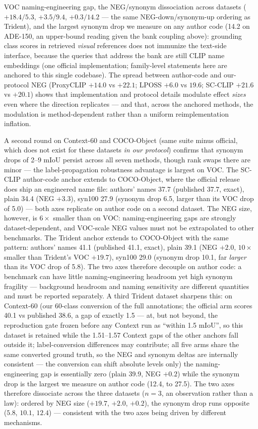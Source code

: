 \documentclass[11pt]{article}
\newcommand{\miou}{mIoU}
\begin{document}
VOC naming-engineering gap, the NEG/synonym dissociation across
datasets ($+18.4/5.3$, $+3.5/9.4$, $+0.3/14.2$ --- the same
NEG-down/synonym-up ordering as Trident), and the largest synonym drop
we measure on any author code (14.2 on ADE-150, an upper-bound reading
given the bank coupling above): grounding class scores
in retrieved \emph{visual} references does not immunize the text-side
interface, because the queries that address the bank are still CLIP
name embeddings (one official implementation; family-level statements
here are anchored to this single codebase).
The spread between author-code and
our-protocol NEG (ProxyCLIP $+14.0$ vs $+22.1$; LPOSS $+6.0$ vs $19.6$;
SC-CLIP $+21.6$ vs $+20.1$)
shows that implementation and protocol details modulate effect \emph{sizes}
even where the direction replicates --- and that, across the anchored
methods, the modulation is method-dependent rather than a uniform
reimplementation inflation.

A second round on Context-60 and COCO-Object (same suite minus official, which
does not exist for these datasets \emph{in our protocol}) confirms that
synonym drops of 2--9 \miou{}
persist across all seven methods, though rank swaps there are minor --- the
label-propagation robustness advantage is largest on VOC. The SC-CLIP
author-code anchor extends to COCO-Object, where the official release does
ship an engineered name file: authors' names 37.7 (published 37.7, exact),
plain 34.4 (NEG $+3.3$), syn100 27.9 (synonym drop 6.5, larger than its VOC
drop of 5.0) --- both axes replicate on author code on a second dataset.
The NEG size, however, is $6\times$ smaller than on VOC: naming-engineering
gaps are strongly dataset-dependent, and VOC-scale NEG values must not be
extrapolated to other benchmarks. The Trident anchor extends to COCO-Object
with the same pattern: authors' names 41.1 (published 41.1, exact), plain
39.1 (NEG $+2.0$, $10\times$ smaller than Trident's VOC $+19.7$), syn100
29.0 (synonym drop 10.1, far \emph{larger} than its VOC drop of 5.8). The
two axes therefore decouple on author code: a benchmark can have little
naming-engineering headroom yet high synonym fragility --- background
headroom and naming sensitivity are different quantities and must be
reported separately. A third Trident dataset sharpens this: on Context-60
(our 60-class conversion of the full annotations; the official arm scores
40.1 vs published 38.6, a gap of exactly 1.5 --- at, but not beyond, the
reproduction gate frozen before any Context run as ``within 1.5 \miou{}'', so this
dataset is retained while the 1.51--1.57 Context gaps of the other anchors fall
outside it; label-conversion differences may contribute; all five arms share the same converted ground
truth, so the NEG and synonym deltas are internally consistent --- the
conversion can shift absolute levels only) the naming-engineering gap is
essentially zero (plain 39.9, NEG $+0.2$) while the synonym drop is the
largest we measure on author code (12.4, to 27.5). The two axes therefore
dissociate across the three datasets ($n{=}3$, an observation rather than
a law): ordered by NEG size ($+19.7$, $+2.0$, $+0.2$), the synonym drop
runs opposite ($5.8$, $10.1$, $12.4$) --- consistent with the two axes
being driven by different mechanisms.
\end{document}
